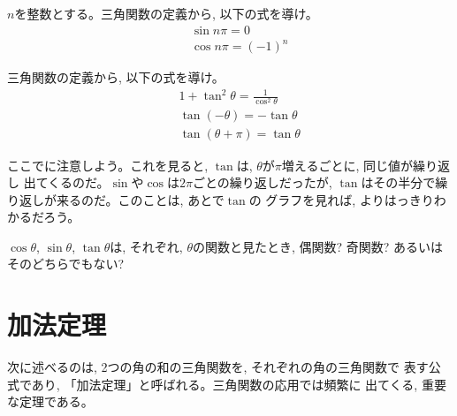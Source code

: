 \begin{q}\label{q:trig_sincos4} $n$を整数とする。三角関数の定義から, 以下の式を導け。
\begin{eqnarray}
&&\sin n\pi=0\label{eq:trig_sinpix}\\
&&\cos n\pi=(-1)^n\label{eq:trig_cospix}
\end{eqnarray}
\end{q}

\begin{q}\label{q:trig_tan} 三角関数の定義から, 以下の式を導け。
\begin{eqnarray}
&&1+\tan^2 \theta = \frac{1}{\cos^2\theta}\\
&&\tan(-\theta) = -\tan\theta\label{q:trig_tan_minus}\\
&&\tan(\theta+\pi) = \tan\theta\label{q:trig_tan_period}
\end{eqnarray}\end{q}
\mv

ここでに注意しよう。これを見ると, 
$\tan$は, $\theta$が$\pi$増えるごとに, 同じ値が繰り返し
出てくるのだ。$\sin$や$\cos$は$2\pi$ごとの繰り返しだったが, 
$\tan$はその半分で繰り返しが来るのだ。このことは, あとで$\tan$の
グラフを見れば, よりはっきりわかるだろう。\mv


\begin{q}\label{q:trig_evenodd} $\cos\theta$, $\sin\theta$, $\tan\theta$は, 
それぞれ, $\theta$の関数と見たとき, 偶関数? 奇関数? あるいはそのどちらでもない?
\end{q}
\mv


\section{加法定理}

次に述べるのは, 2つの角の和の三角関数を, それぞれの角の三角関数で
表す公式であり, 「加法定理」と呼ばれる。三角関数の応用では頻繁に
出てくる, 重要な定理である。

